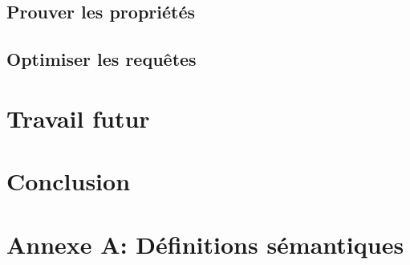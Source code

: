 \documentclass[a4paper,11pt]{article}
\begin{document}
\subsection{Prouver les propriétés}
\label{proof}


\subsection{Optimiser les requêtes}
\label{opti}


\section{Travail futur}
\label{discusion}


\section{Conclusion}


 \newpage
 \appendix
\section*{Annexe A: Définitions sémantiques}

\end{document}
